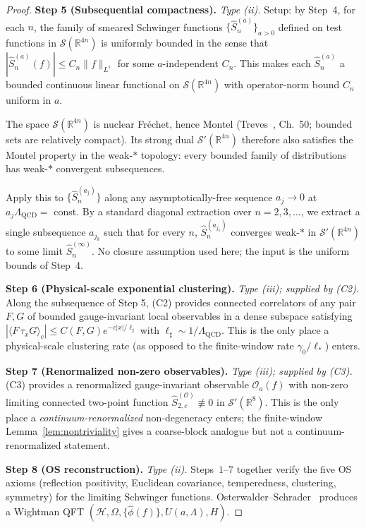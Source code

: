 \documentclass[11pt]{article}
\theoremstyle{definition}
\newcommand{\R}{\mathbb{R}}
\newcommand{\Lam}{\Lambda_{\mathrm{QCD}}}
\begin{document}
\begin{proof}
\medskip\noindent\textbf{Step 5 (Subsequential compactness).}
\textit{Type \textup{(ii)}.}  Setup: by Step~4, for each $n$, the
family of smeared Schwinger functions
$\{\hat S_n^{(a)}\}_{a>0}$ defined on test functions in
$\mathcal S(\R^{4n})$ is uniformly bounded in the sense that
$|\hat S_n^{(a)}(f)| \le C_n \|f\|_{L^1}$ for some $a$-independent
$C_n$.  This makes each $\hat S_n^{(a)}$ a bounded continuous linear
functional on $\mathcal S(\R^{4n})$ with operator-norm bound
$C_n$ uniform in $a$.

The space $\mathcal S(\R^{4n})$ is nuclear Fr\'echet, hence Montel
\textup{(}Treves~\cite{Treves}, Ch.~50; bounded sets are relatively
compact\textup{)}.  Its strong dual $\mathcal S'(\R^{4n})$ therefore
also satisfies the Montel property in the weak-$*$ topology: every
bounded family of distributions has weak-$*$ convergent subsequences.

Apply this to $\{\hat S_n^{(a_j)}\}$ along any asymptotically-free
sequence $a_j\to 0$ at $a_j\Lam=$ const.  By a standard
diagonal extraction over $n=2,3,\ldots$, we extract a single
subsequence $a_{j_k}$ such that for every $n$, $\hat S_n^{(a_{j_k})}$
converges weak-$*$ in $\mathcal S'(\R^{4n})$ to some limit
$\hat S_n^{(\infty)}$.  No closure assumption used here; the input is
the uniform bounds of Step~4.

\medskip\noindent\textbf{Step 6 (Physical-scale exponential
clustering).}
\textit{Type \textup{(iii)}; supplied by \textup{(C2)}.}  Along the
subsequence of Step 5, \textup{(C2)} provides connected correlators
of any pair $F,G$ of bounded gauge-invariant local observables in a
dense subspace satisfying
$|\langle F\,\tau_x G\rangle_c| \le C(F,G) e^{-c|x|/\ell_\sharp}$
with $\ell_\sharp\sim 1/\Lam$.  This is the only place a
physical-scale clustering rate \textup{(}as opposed to the
finite-window rate $\gamma_0/\ell_*$\textup{)} enters.

\medskip\noindent\textbf{Step 7 (Renormalized non-zero observables).}
\textit{Type \textup{(iii)}; supplied by \textup{(C3)}.}  \textup{(C3)}
provides a renormalized gauge-invariant observable $\mathcal O_a(f)$
with non-zero limiting connected two-point function
$\hat S_{2,c}^{(\mathcal O)}\not\equiv 0$ in
$\mathcal S'(\R^{8})$.  This is the only place a
\emph{continuum-renormalized} non-degeneracy enters; the
finite-window Lemma~\ref{lem:nontriviality} gives a coarse-block
analogue but not a continuum-renormalized statement.

\medskip\noindent\textbf{Step 8 (OS reconstruction).}
\textit{Type \textup{(ii)}.}  Steps~$1$--$7$ together verify the five
OS axioms \textup{(}reflection positivity, Euclidean covariance,
temperedness, clustering, symmetry\textup{)} for the limiting
Schwinger functions.  Osterwalder--Schrader~\cite{OS73} produces a
Wightman QFT $(\mathcal H, \Omega, \{\hat\phi(f)\}, U(a,\Lambda), H)$.


\end{proof}
\end{document}
